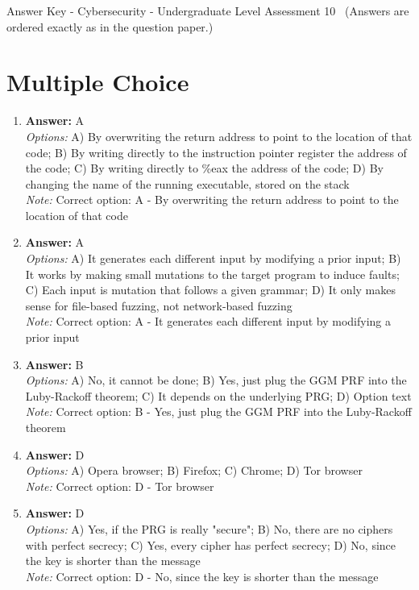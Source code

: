 \documentclass[12pt]{article}
\begin{document}
\begin{center}
Answer Key - Cybersecurity - Undergraduate Level Assessment 10 \
\small (Answers are ordered exactly as in the question paper.)
\end{center}

\section*{Multiple Choice}
\begin{enumerate}[label=\arabic*.]
\item \textbf{Answer:} A
\\ \textit{Options:} A) By overwriting the return address to point to the location of that code; B) By writing directly to the instruction pointer register the address of the code; C) By writing directly to \%eax the address of the code; D) By changing the name of the running executable, stored on the stack
\\ \textit{Note:} Correct option: A - By overwriting the return address to point to the location of that code
\item \textbf{Answer:} A
\\ \textit{Options:} A) It generates each different input by modifying a prior input; B) It works by making small mutations to the target program to induce faults; C) Each input is mutation that follows a given grammar; D) It only makes sense for file-based fuzzing, not network-based fuzzing
\\ \textit{Note:} Correct option: A - It generates each different input by modifying a prior input
\item \textbf{Answer:} B
\\ \textit{Options:} A) No, it cannot be done; B) Yes, just plug the GGM PRF into the Luby-Rackoff theorem; C) It depends on the underlying PRG; D) Option text
\\ \textit{Note:} Correct option: B - Yes, just plug the GGM PRF into the Luby-Rackoff theorem
\item \textbf{Answer:} D
\\ \textit{Options:} A) Opera browser; B) Firefox; C) Chrome; D) Tor browser
\\ \textit{Note:} Correct option: D - Tor browser
\item \textbf{Answer:} D
\\ \textit{Options:} A) Yes, if the PRG is really "secure"; B) No, there are no ciphers with perfect secrecy; C) Yes, every cipher has perfect secrecy; D) No, since the key is shorter than the message
\\ \textit{Note:} Correct option: D - No, since the key is shorter than the message
\end{enumerate}
\end{document}
